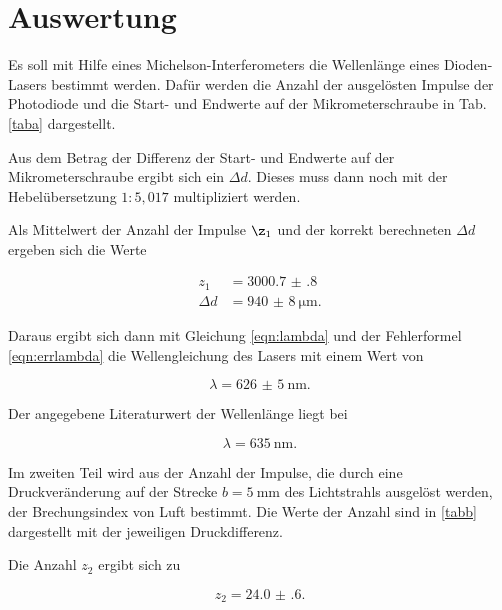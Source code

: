 \section{Auswertung}
\label{sec:Auswertung}

\noindent Es soll mit Hilfe eines Michelson-Interferometers die Wellenlänge eines Dioden-Lasers bestimmt werden. 
Dafür werden die Anzahl der ausgelösten Impulse der Photodiode und die Start- und Endwerte auf der Mikrometerschraube in Tab. \ref{taba} dargestellt.  



\noindent Aus dem Betrag der Differenz der Start- und Endwerte auf der Mikrometerschraube ergibt sich ein $\Delta d$. Dieses muss dann noch mit der Hebelübersetzung $1:5,017$  multipliziert werden. 

\noindent Als Mittelwert der Anzahl der Impulse $\z_1$ und der korrekt berechneten $\Delta d$ ergeben sich die Werte 

\begin{align*} 
   z_1 &= \num{3000.7(8)} \\
   \Delta d &= \SI{940(8)}{\micro\meter}.
\end{align*}

\noindent Daraus ergibt sich dann mit Gleichung \eqref{eqn:lambda} und der Fehlerformel \eqref{eqn:errlambda} die Wellengleichung des Lasers mit einem Wert von 

\begin{equation*}
    \lambda = \SI{626(5)}{\nano\meter}.
\end{equation*}

\noindent Der angegebene Literaturwert der Wellenlänge liegt bei 

\begin{equation*}
    \lambda = \SI{635}{\nano\meter}.
\end{equation*}


\noindent Im zweiten Teil wird aus der Anzahl der Impulse, die durch eine Druckveränderung auf der Strecke $b = \SI{5}{\milli\meter}$ des Lichtstrahls ausgelöst werden, der Brechungsindex von Luft bestimmt. 
Die Werte der Anzahl sind in \ref{tabb} dargestellt mit der jeweiligen Druckdifferenz. 



\noindent Die Anzahl $z_2$ ergibt sich zu 

\begin{equation*}
    z_2 = \num{24.0(6)}.
\end{equation*}

